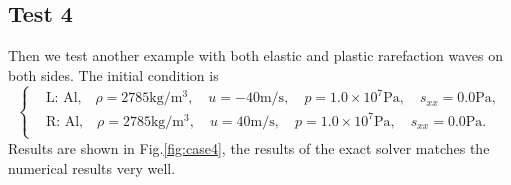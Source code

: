 \documentclass{article}
\numberwithin{equation}{section}
\numberwithin{table}{section}
\begin{document}
\subsection{Test 4}
Then we test another example with both elastic and plastic rarefaction  waves on both sides. The initial condition is
\begin{equation}
 \left\{ \begin{aligned}
	 &	 \text{L: Al,}\quad  \rho = 2785 \text{kg}/\text{m}^3, \quad  u = -40\text{m}/\text{s}, \quad  p = 1.0\times 10^7 \text{Pa}, \quad  s_{xx}=0.0 \text{Pa},\\
	 &	 \text{R: Al,}\quad  \rho = 2785 \text{kg}/\text{m}^3, \quad  u = 40\text{m}/\text{s}, \quad  p = 1.0\times 10^7\text{Pa}, \quad  s_{xx}=0.0 \text{Pa}.\\
   \end{aligned}
 \right.
\end{equation}
Results are shown in Fig.\ref{fig:case4},  the results of the exact solver matches the numerical results very well.
\end{document}
